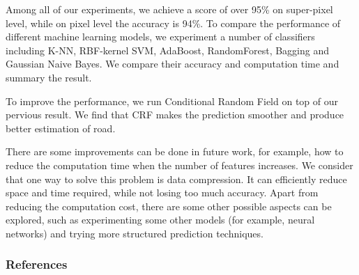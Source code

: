 \documentclass{article} %
\begin{document}
Among all of our experiments, we achieve a score of over 95\% on super-pixel level, while on pixel level the accuracy is 94\%. To compare the performance of different machine learning models, we experiment a number of classifiers including K-NN, RBF-kernel SVM, AdaBoost, RandomForest, Bagging and Gaussian Naive Bayes. We compare their accuracy and computation time and summary the result.

To improve the performance, we run Conditional Random Field on top of our pervious result. We find that CRF makes the prediction smoother and produce better estimation of road.

There are some improvements can be done in future work, for example, how to reduce the computation time when the number of features increases. We consider that one way to solve this problem is data compression. It can efficiently reduce space and time required, while not losing too much accuracy. Apart from reducing the computation cost, there are some other possible aspects can be explored, such as experimenting some other models (for example, neural networks) and trying more structured prediction techniques.

\newpage

\subsubsection*{References}
\end{document}
